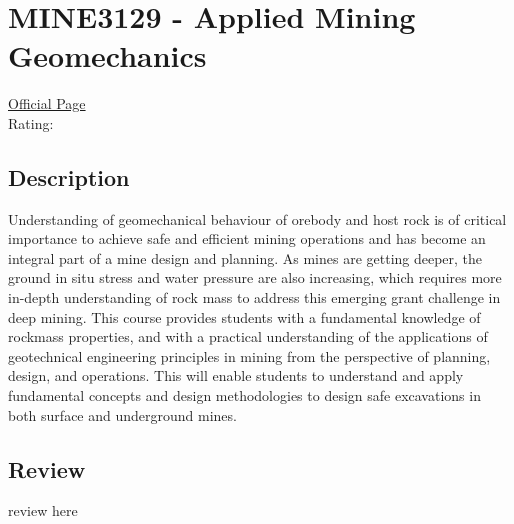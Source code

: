 \hypertarget{MINE3129}{\section{MINE3129 - Applied Mining Geomechanics}}

\large
\textcolor{turbo_purple}{\href{https://my.uq.edu.au/programs-courses/course.html?course_code=MINE3129}{Official Page}} \\
Rating: \cstar\cstar\cstar\cstar\ostar

\normalsize
\subsection*{Description}
Understanding of geomechanical behaviour of orebody and host rock is of critical importance to achieve safe and efficient mining operations and has become an integral part of a mine design and planning.
As mines are getting deeper, the ground in situ stress and water pressure are also increasing, which requires more in-depth understanding of rock mass to address this emerging grant challenge in deep mining.
This course provides students with a fundamental knowledge of rockmass properties, and with a practical understanding of the applications of geotechnical engineering principles in mining from the perspective of planning, design, and operations.
This will enable students to understand and apply fundamental concepts and design methodologies to design safe excavations in both surface and underground mines.

\subsection*{Review}
review here
